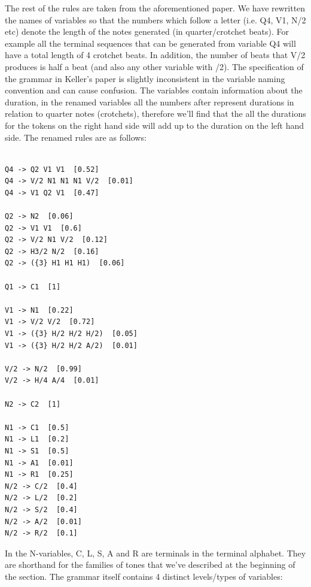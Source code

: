 \documentclass[pdftex,12pt,a4paper]{report}
\begin{document}
The rest of the rules are taken from the aforementioned paper. We have rewritten the names of variables so that the numbers which follow a letter (i.e. Q4, V1, N/2 etc) denote the length of the notes generated (in quarter/crotchet beats). For example all the terminal sequences that can be generated from variable Q4 will have a total length of 4 crotchet beats. In addition, the number of beats that V/2 produces is half a beat (and also any other variable with /2). The specification of the grammar in Keller's paper \cite{keller07} is slightly inconsistent in the variable naming convention and can cause confusion. The variables contain information about the duration, in the renamed variables all the numbers after represent durations in relation to quarter notes (crotchets), therefore we'll find that the all the durations for the tokens on the right hand side will add up to the duration on the left hand side. The renamed rules are as follows:

\begin{verbatim}

Q4 -> Q2 V1 V1  [0.52]
Q4 -> V/2 N1 N1 N1 V/2  [0.01]
Q4 -> V1 Q2 V1  [0.47]

Q2 -> N2  [0.06]
Q2 -> V1 V1  [0.6]
Q2 -> V/2 N1 V/2  [0.12]
Q2 -> H3/2 N/2  [0.16]
Q2 -> ({3} H1 H1 H1)  [0.06]

Q1 -> C1  [1]

V1 -> N1  [0.22]
V1 -> V/2 V/2  [0.72]
V1 -> ({3} H/2 H/2 H/2)  [0.05]
V1 -> ({3} H/2 H/2 A/2)  [0.01]

V/2 -> N/2  [0.99]
V/2 -> H/4 A/4  [0.01]

N2 -> C2  [1]

N1 -> C1  [0.5]
N1 -> L1  [0.2]
N1 -> S1  [0.5]
N1 -> A1  [0.01]
N1 -> R1  [0.25]
N/2 -> C/2  [0.4]
N/2 -> L/2  [0.2]
N/2 -> S/2  [0.4]
N/2 -> A/2  [0.01]
N/2 -> R/2  [0.1]

\end{verbatim}

In the N-variables, C, L, S, A and R are terminals in the terminal alphabet. They are shorthand for the families of tones that we've described at the beginning of the section. The grammar itself contains 4 distinct levels/types of variables:
\end{document}
